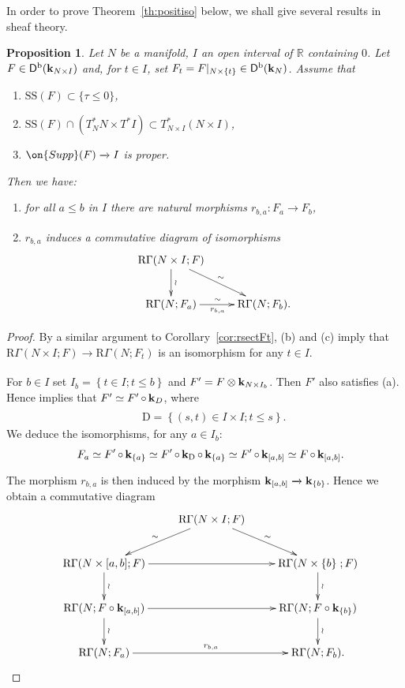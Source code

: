\documentclass[12pt,leqno]{article}
\newtheorem{proposition}[theorem]{Proposition}
\theoremstyle{definition}
\newcommand{\R}{{\mathbb{R}}}
\newcommand{\cor}{{\bf k}}
\renewcommand{\to}[1][]{\xrightarrow[]{#1}}
\newcommand{\rsect}{\mathrm{R}\Gamma}
\newcommand{\conv}[1][]{\mathop{\circ}\limits_{#1}}
\newcommand{\cl}{\colon}
\newcommand{\bnum}{\begin{enumerate}[{\rm(i)}]}
\newcommand{\enum}{\end{enumerate}}
\newcommand{\banum}{\begin{enumerate}[{\rm(a)}]}
\newcommand{\eanum}{\end{enumerate}}
\newcommand{\eq}{\begin{eqnarray}}
\newcommand{\eneq}{\end{eqnarray}}
\newcommand{\eqn}{\begin{eqnarray*}}
\newcommand{\eneqn}{\end{eqnarray*}}
\newcommand{\set}[2]{\left\{#1 \mathbin{;} #2 \right\}}
\newcommand{\Supp}{\on{Supp}}
\newcommand{\Der}[1][]{\mathsf{D}^{#1}}
\newcommand{\Derb}{\Der[\mathrm{b}]}
\newcommand{\SSi}{\mathrm{SS}}
\newcommand{\DD}{\mathrm{D}}
\numberwithin{equation}{section}
\begin{document}
In order to prove Theorem~\ref{th:positiso} below,
we shall give several results in sheaf theory.

\begin{proposition}\label{pro:microsupp}
Let $N$ be a manifold, $I$ an open interval of $\R$ containing $0$. Let
$F\in\Derb(\cor_{N\times I})$ and, for $t\in I$, 
set $F_t=F|_{N\times\{t\}}\in\Derb(\cor_N)$.
Assume that
\banum
\item
$\SSi(F)\subset\{\tau\leq 0\}$,
\item
$\SSi(F)\cap (T^*_NN\times T^*I)\subset
 T^*_{N\times I}(N\times I)$,
\item
$\Supp(F)\to I$ is proper.
\eanum
Then we have:
\bnum
\item
for all $a\leq b$ in $I$ there are natural morphisms
$r_{b,a}\cl F_a\to F_b$,
\item $r_{b,a}$ induces a commutative diagram of isomorphisms 
$$\xymatrix{
{\rsect(N\times I;F)}\ar[d]^\wr\ar[dr]^\sim\\
{\rsect(N;F_a)}\ar[r]^{\sim}_{r_{b,a}}& {\rsect(N;F_b).}
}$$
\enum
\end{proposition}
\begin{proof}
By a similar argument to Corollary~\ref{cor:rsectFt}, 
(b) and (c) imply that
$\rsect(N\times I;F)\to\rsect(N;F_t)$ is an isomorphism
for any $t\in I$.

\medskip\noindent
For $b\in I$ set $I_b=\set{t\in I}{t\le b}$
and $F'=F\otimes\cor_{N\times I_b}$.
Then $F'$ also satisfies (a).
Hence \cite[Prop. 5.2.3]{KS90} implies that
$F'\simeq F'\conv\cor_D$,
where
\eqn
&&\DD=\set{(s,t)\in I\times I}{t\le s}.
\eneqn
We deduce the isomorphisms, for any $a\in I_b$\;:
\eq\label{eq:microsupp2}
&&F_{a} \simeq F' \conv \cor_{\{a\}} 
\simeq F'\conv\cor_{\DD}\conv\cor_{\{a\}} 
\simeq F'\conv\cor_{[a,b]}
\simeq F\conv\cor_{[a,b]}.
\eneq
The morphism $r_{b,a}$ is then induced by the morphism 
$\cor_{[a,b]} \to \cor_{\{b\}}$.
Hence we obtain 
a commutative diagram 
\eqn
&&\xymatrix{
&\rsect(N\times I;F)\ar[dl]_\sim\ar[dr]^\sim\\
\rsect(N\times [a,b];F)\ar[d]^\wr\ar[rr]
&&\rsect(N\times \{b\}\;;F)\ar[d]^\wr\\
\rsect(N;F\circ \cor_{[a,b]})\ar[rr]\ar[d]^\wr&&\rsect(N;F\circ \cor_{\{b\}})
\ar[d]^\wr\\
\rsect(N;F_a)\ar[rr]^{r_{b,a}}&&\rsect(N;F_b).
}
\eneqn
\end{proof}
\end{document}
